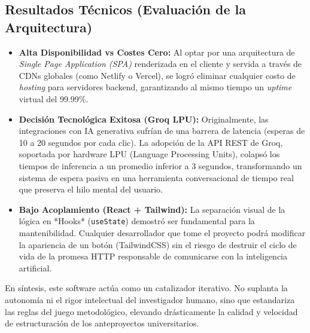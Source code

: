 \subsection{Resultados Técnicos (Evaluación de la Arquitectura)}
\begin{itemize}
    \item \textbf{Alta Disponibilidad vs Costes Cero:} Al optar por una arquitectura de \textit{Single Page Application (SPA)} renderizada en el cliente y servida a través de CDNs globales (como Netlify o Vercel), se logró eliminar cualquier costo de \textit{hosting} para servidores backend, garantizando al mismo tiempo un \textit{uptime} virtual del 99.99\%.
    \item \textbf{Decisión Tecnológica Exitosa (Groq LPU):} Originalmente, las integraciones con IA generativa sufrían de una barrera de latencia (esperas de 10 a 20 segundos por cada clic). La adopción de la API REST de Groq, soportada por hardware LPU (Language Processing Units), colapsó los tiempos de inferencia a un promedio inferior a 3 segundos, transformando un sistema de espera pasiva en una herramienta conversacional de tiempo real que preserva el hilo mental del usuario.
    \item \textbf{Bajo Acoplamiento (React + Tailwind):} La separación visual de la lógica en *Hooks* (\texttt{useState}) demostró ser fundamental para la mantenibilidad. Cualquier desarrollador que tome el proyecto podrá modificar la apariencia de un botón (TailwindCSS) sin el riesgo de destruir el ciclo de vida de la promesa HTTP responsable de comunicarse con la inteligencia artificial.
\end{itemize}

En síntesis, este software actúa como un catalizador iterativo. No suplanta la autonomía ni el rigor intelectual del investigador humano, sino que estandariza las reglas del juego metodológico, elevando drásticamente la calidad y velocidad de estructuración de los anteproyectos universitarios.
